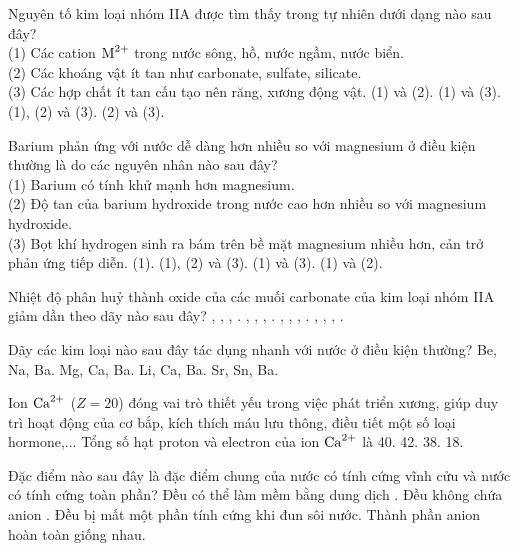 \documentclass[11pt,a4paper]{article}
\def\loigiai#1{}
\begin{document}
\begin{ex}
Nguyên tố kim loại nhóm IIA được tìm thấy trong tự nhiên dưới dạng nào sau đây?\\
(1) Các cation $\ce{M^2+}$ trong nước sông, hồ, nước ngầm, nước biển.\\
(2) Các khoáng vật ít tan như carbonate, sulfate, silicate.\\
(3) Các hợp chất ít tan cấu tạo nên răng, xương động vật.
\choice
{(1) và (2).}
{(1) và (3).}
{(1), (2) và (3).}
{(2) và (3).}
\loigiai{}
\end{ex}

\begin{ex}
Barium phản ứng với nước dễ dàng hơn nhiều so với magnesium ở điều kiện thường là do các nguyên nhân nào sau đây?\\
(1) Barium có tính khử mạnh hơn magnesium.\\
(2) Độ tan của barium hydroxide trong nước cao hơn nhiều so với magnesium hydroxide.\\
(3) Bọt khí hydrogen sinh ra bám trên bề mặt magnesium nhiều hơn, cản trở phản ứng tiếp diễn.
\choice
{(1).}
{(1), (2) và (3).}
{(1) và (3).}
{(1) và (2).}
\loigiai{}
\end{ex}

\begin{ex}
Nhiệt độ phân huỷ thành oxide của các muối carbonate của kim loại nhóm IIA giảm dần theo dãy nào sau đây?
\choice
{, , , .}
{, , , .}
{, , , .}
{, , , .}
\loigiai{}
\end{ex}

\begin{ex}
Dãy các kim loại nào sau đây tác dụng nhanh với nước ở điều kiện thường?
\choice
{Be, Na, Ba.}
{Mg, Ca, Ba.}
{Li, Ca, Ba.}
{Sr, Sn, Ba.}
\loigiai{}
\end{ex}

\begin{ex}
Ion $\ce{Ca^2+}$ ($Z = 20$) đóng vai trò thiết yếu trong việc phát triển xương, giúp duy trì hoạt động của cơ bắp, kích thích máu lưu thông, điều tiết một số loại hormone,... Tổng số hạt proton và electron của ion $\ce{Ca^2+}$ là
\choice
{40.}
{42.}
{38.}
{18.}
\loigiai{}
\end{ex}

\begin{ex}
Đặc điểm nào sau đây là đặc điểm chung của nước có tính cứng vĩnh cửu và nước có tính cứng toàn phần?
\choice
{Đều có thể làm mềm bằng dung dịch .}
{Đều không chứa anion .}
{Đều bị mất một phần tính cứng khi đun sôi nước.}
{Thành phần anion hoàn toàn giống nhau.}
\loigiai{}
\end{ex}
\end{document}
